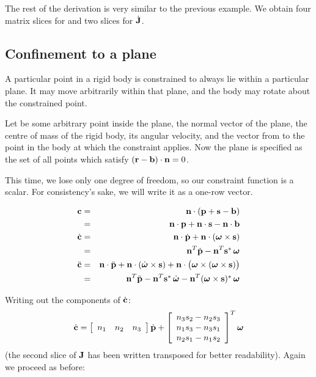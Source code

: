The rest of the derivation is very similar to the previous example. We obtain four
matrix slices for  and two slices for $\dot{\m{J}}$.


\subsection{Confinement to a plane}

A particular point in a rigid body is constrained to always lie within a particular plane.
It may move arbitrarily within that plane, and the body may rotate about the constrained point.

Let  be some arbitrary point inside the plane,  the normal vector of
the plane,  the centre of mass of the rigid body, \ve{\omega} its angular
velocity, and  the vector from  to the point in the body at which the
constraint applies. Now the plane is specified as the set of all points  which
satisfy $(\ve{r} - \ve{b})\cdot\ve{n} = 0$.

This time, we lose only one degree of freedom, so our constraint function is a scalar. For
consistency's sake, we will write it as a one-row vector.

\begin{eqnarray}
\ve{c} &=& \ve{n}\cdot(\ve{p} + \ve{s} - \ve{b}) \nonumber\\
&=& \ve{n}\cdot\ve{p} + \ve{n}\cdot\ve{s} - \ve{n}\cdot\ve{b} \\
\dot{\ve{c}} & = & \ve{n}\cdot\dot{\ve{p}} +
    \ve{n}\cdot(\ve{\omega}\times\ve{s}) \nonumber\\
&=& \ve{n}^T\dot{\ve{p}} - \ve{n}^T \dual{\ve{s}}\,\ve{\omega} \\
\ddot{\ve{c}} &=& \ve{n}\cdot\ddot{\ve{p}} +
    \ve{n}\cdot(\dot{\ve{\omega}}\times\ve{s}) +
    \ve{n}\cdot\big(\ve{\omega}\times(\ve{\omega}\times\ve{s})\big) \nonumber\\
&=& \ve{n}^T\ddot{\ve{p}} - \ve{n}^T \dual{\ve{s}}\,\dot{\ve{\omega}} -
    \ve{n}^T \dual{(\ve{\omega}\times\ve{s})}\,\ve{\omega}
\end{eqnarray}

Writing out the components of $\dot{\ve{c}}$:
\begin{equation}
\dot{\ve{c}} = \left[\begin{array}{ccc} n_1 & n_2 & n_3 \end{array}\right] \dot{\ve{p}} +
    \left[\begin{array}{c}
    n_3 s_2 - n_2 s_3 \\
    n_1 s_3 - n_3 s_1 \\
    n_2 s_1 - n_1 s_2 \end{array}\right]^T \ve{\omega}
\end{equation}
(the second slice of $\m{J}$ has been written transposed for better readability). Again
we proceed as before:

